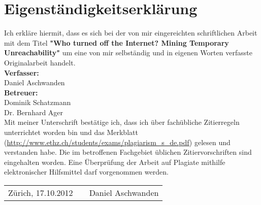 

\chapter*{Eigenständigkeitserklärung} Ich erkläre hiermit, dass es sich bei
der von mir eingereichten schriftlichen Arbeit mit dem Titel
\textbf{"Who turned off the Internet? Mining Temporary Unreachability"} um eine von mir selbständig und in eigenen Worten verfasste
Originalarbeit handelt.\\

\vspace{5mm} \textbf{Verfasser:}\\
Daniel Aschwanden\\

\vspace{5mm} \textbf{Betreuer:}\\
Dominik Schatzmann\\
Dr. Bernhard Ager\\

\vspace{5mm} Mit meiner Unterschrift bestätige ich, dass ich über fachübliche
Zitierregeln unterrichtet worden bin und das Merkblatt
(\url{http://www.ethz.ch/students/exams/plagiarism_s_de.pdf}) gelesen und
verstanden habe. Die im betroffenen Fachgebiet üblichen Zitiervorschriften sind
eingehalten worden.
Eine Überprüfung der Arbeit auf Plagiate mithilfe elektronischer Hilfsmittel
darf vorgenommen werden.\\

\vspace{15mm} 
\begin{tabular}
	{l p{} r} Zürich, 17.10.2012 &&
	Daniel Aschwanden \\
\end{tabular}

\vfil